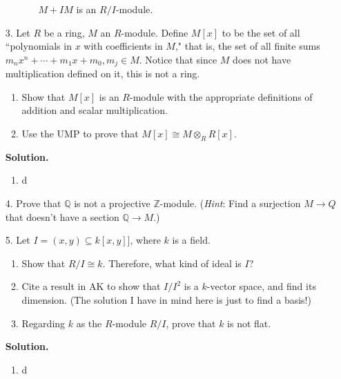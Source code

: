 \documentclass[9pt]{article}
\newcommand{\Z}{\mathbb{Z}}
\newcommand{\Q}{\mathbb{Q}}
\begin{document}
\begin{enumerate}
\begin{enumerate}
\begin{itemize}
                  $M+IM$ is an $R/I$-module.
               \end{itemize}
      \end{enumerate}
   \item[3.]   Let $R$ be a ring, $M$ an $R$-module. Define $M[x]$ to be the set
               of all ``polynomials in $x$ with coefficients in $M$," that is,
               the set of all finite sums
               $m_nx^n + \cdots + m_1x + m_0, m_j \in M$. Notice that since $M$
               does not have multiplication defined on it, this is not a ring.
               \begin{enumerate}
                  \item Show that $M[x]$ is an $R$-module with the appropriate
                        definitions of addition and scalar multiplication.
                  \item Use the UMP to prove that $M[x] \cong M \otimes_R R[x]$.
               \end{enumerate}

      \textbf{Solution.}
      
      \begin{enumerate}
         \item d
      \end{enumerate}
   \item[4.]   Prove that $\Q$ is not a projective $\Z$-module. (\textit{Hint}:
               Find a surjection $M \rightarrow Q$ that doesn't have a section
               $\Q \rightarrow M$.)
   \item[5.]   Let $I = (x, y) \subseteq k[x, y]]$, where $k$ is a field.
               \begin{enumerate}
                  \item Show that $R/I \cong k$. Therefore, what kind of ideal
                        is $I$?
                  \item Cite a result in AK to show that $I/I^2$ is a $k$-vector
                        space, and find its dimension. (The solution I have in
                        mind here is just to find a basis!)
                  \item Regarding $k$ as the $R$-module $R/I$, prove that $k$ is
                        not flat.
               \end{enumerate}

      \textbf{Solution.}
      
      \begin{enumerate}
         \item d
      \end{enumerate}
\end{enumerate}
\end{document}
